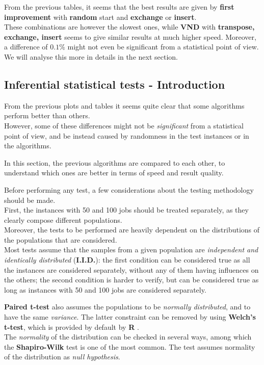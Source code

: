 \documentclass[
12pt,
a4paper,
oneside,
headinclude,
footinclude]{article}
\theoremstyle{definition} %
\begin{document}
\newpage

From the previous tables, it seems that the best results are given by \textbf{first improvement} with \textbf{random} start and \textbf{exchange} or \textbf{insert}.\\
These combinations are however the slowest ones, while \textbf{VND} with \textbf{transpose, exchange, insert} seems to give similar results at much higher speed.
Moreover, a difference of $0.1\%$ might not even be significant from a statistical point of view. We will analyse this more in details in the next section.  

\subsection{Inferential statistical tests - Introduction}
From the previous plots and tables it seems quite clear that some algorithms perform better than others.\\
However, some of these differences might not be \textit{significant} from a statistical point of view, and be instead caused by randomness in the test instances or in the algorithms.

In this section, the previous algorithms are compared to each other, to understand which ones are better in terms of speed and result quality.

Before performing any test, a few considerations about the testing methodology should be made.\\
First, the instances with 50 and 100 jobs should  be treated separately, as they clearly compose different populations.\\
Moreover, the tests to be performed are heavily dependent on the distributions of the populations that are considered.\\
Most tests assume that the samples from a given population are \textit{independent and identically distributed} (\textbf{I.I.D.}): the first condition can be considered true as all the instances are considered separately, without any of them having influences on the others; the second condition is harder to verify, but can be considered true as long as instances with 50 and 100 jobs are considered separately.

\textbf{Paired t-test} also assumes the populations to be \textit{normally distributed}, and to have the same \textit{variance}. The latter constraint can be removed by using \textbf{Welch's t-test}, which is provided by default by \textbf{R} \cite{welch1947generalization}. \\
The \textit{normality} of the distribution can be checked in several ways, among which the \textbf{Shapiro-Wilk} test is one of the most common. \cite{shapiro1965analysis}
The test assumes normality of the distribution as \textit{null hypothesis}.
\end{document}
